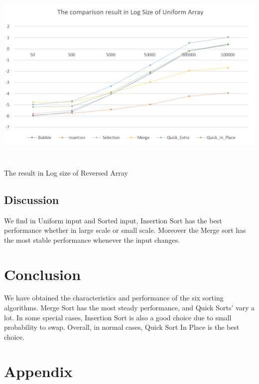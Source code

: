 \documentclass{article}
\begin{document}
\begin{center}
    \includegraphics[height = 9cm]{result5.PNG}
    \caption{The result in Log size of Reversed Array}
\end{center}

\subsection{Discussion}

We find in Uniform input and Sorted input, Insertion Sort has the best performance whether in large scale or small scale. Moreover the Merge sort has the most stable performance whenever the input changes. 

\section{Conclusion}

We have obtained the characteristics and performance of the six sorting algorithms. Merge Sort has the most steady performance, and Quick Sorts' vary a lot. In some special cases, Insertion Sort is also a good choice due to small probability to swap. Overall, in normal cases, Quick Sort In Place is the best choice. 



\section{Appendix}
\end{document}
